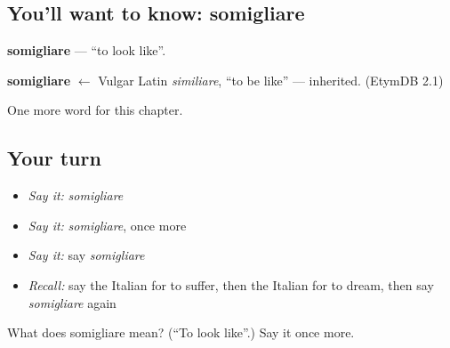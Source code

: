 \subsection*{You'll want to know: somigliare}
\textbf{somigliare} — \textquotedblleft{}to look like\textquotedblright{}.

\begin{cousinweb}
\textbf{somigliare} $\leftarrow$ Vulgar Latin \emph{similiare}, \textquotedblleft{}to be like\textquotedblright{} — inherited. (EtymDB 2.1)
\end{cousinweb}

\begin{grammarlens}[title={What you've built}]
One more word for this chapter.
\end{grammarlens}

\subsection*{Your turn}
\begin{itemize}
\raggedright
  \item \emph{Say it:} \emph{somigliare}
  \item \emph{Say it:} \emph{somigliare}, once more
  \item \emph{Say it:} say \emph{somigliare}
  \item \emph{Recall:} say the Italian for to suffer, then the Italian for to dream, then say \emph{somigliare} again
\end{itemize}

\begin{tcolorbox}[breakable,colback=teal!4,colframe=teal!35!black,title={Before you move on}]
What does somigliare mean? (\textquotedblleft{}To look like\textquotedblright{}.) Say it once more.
\end{tcolorbox}
